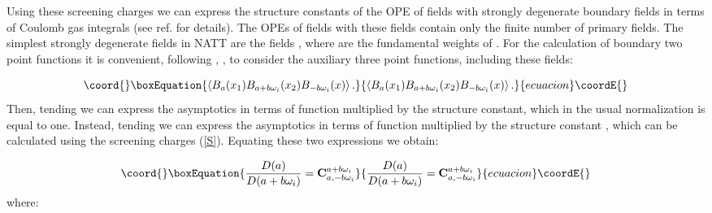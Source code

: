 \documentclass[a4paper,12pt]{article}
\begin{document}
Using these screening charges we can express the structure constants of the
OPE of fields \coordHE{} with strongly degenerate boundary fields in terms of
Coulomb gas integrals (see ref.\cite{FZZA} for details). The OPEs of fields 
\coordHE{} with these fields contain only the finite number of primary fields. The
simplest strongly degenerate fields in NATT are the fields \coordHE{},  
where \coordHE{} are the fundamental weights of \coordHE{}. For the calculation
of boundary two point functions \coordHE{} it is convenient, following \cite{TEC}, 
\cite{FZZA}, to consider the auxiliary three point functions, including these
fields:

\begin{equation}\coord{}\boxEquation{
\left\langle B_a(x_1)B_{a+b\omega _i}(x_2)B_{-b\omega _i}(x)\right\rangle.
\label{AU}
}{
\left\langle B_a(x_1)B_{a+b\omega _i}(x_2)B_{-b\omega _i}(x)\right\rangle.
}{ecuacion}\coordE{}\end{equation}
Then, tending \coordHE{} we can express the asymptotics in terms of
function \coordHE{} multiplied by the structure constant, which in the usual
normalization is equal to one. Instead, tending \coordHE{} we can
express the asymptotics in terms of function \coordHE{} multiplied by
the structure constant \coordHE{}, which can
be calculated using the screening charges (\ref{S}). Equating these two
expressions we obtain:

\begin{equation}\coord{}\boxEquation{
\frac{D(a)}{D(a+b\omega _i)}={\bf C}_{a,-b\omega _i}^{a+b\omega _i}
\label{SC}
}{
\frac{D(a)}{D(a+b\omega _i)}={\bf C}_{a,-b\omega _i}^{a+b\omega _i}
}{ecuacion}\coordE{}\end{equation}
where:
\end{document}
